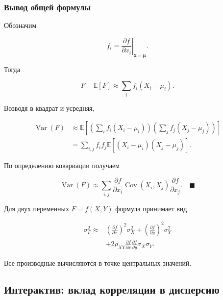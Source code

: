 \documentclass[
  russian,
  12pt,
  a4paper,
  a4paper,
  openany]{scrbook}
\begin{document}
\begin{bookderivation}

\subsubsection{Вывод общей
формулы}\label{ux432ux44bux432ux43eux434-ux43eux431ux449ux435ux439-ux444ux43eux440ux43cux443ux43bux44b}

Обозначим

\[
f_i=\left.\frac{\partial f}{\partial x_i}\right|_{\mathbf x=\boldsymbol\mu}.
\]

Тогда

\[
F-\mathbb E[F]\approx\sum_i f_i(X_i-\mu_i).
\]

Возводя в квадрат и усредняя,

\[
\begin{aligned}
\operatorname{Var}(F)
&\approx
\mathbb E\!\left[
\left(\sum_i f_i(X_i-\mu_i)\right)
\left(\sum_j f_j(X_j-\mu_j)\right)
\right]\\
&=
\sum_{i,j}f_i f_j
\mathbb E[(X_i-\mu_i)(X_j-\mu_j)].
\end{aligned}
\]

По определению ковариации получаем

\[
\boxed{
\operatorname{Var}(F)
\approx
\sum_{i,j}
\frac{\partial f}{\partial x_i}
\operatorname{Cov}(X_i,X_j)
\frac{\partial f}{\partial x_j}.
}
\quad\blacksquare
\]

\end{bookderivation}

Для двух переменных \(F=f(X,Y)\) формула принимает вид

\[
\boxed{
\begin{aligned}
\sigma_F^2\approx{}&
\left(\frac{\partial f}{\partial x}\right)^2\sigma_X^2
+\left(\frac{\partial f}{\partial y}\right)^2\sigma_Y^2\\
&+2\rho_{XY}
\frac{\partial f}{\partial x}
\frac{\partial f}{\partial y}
\sigma_X\sigma_Y.
\end{aligned}
}
\]

Все производные вычисляются в точке центральных значений.

\subsection{Интерактив: вклад корреляции в
дисперсию}\label{ux438ux43dux442ux435ux440ux430ux43aux442ux438ux432-ux432ux43aux43bux430ux434-ux43aux43eux440ux440ux435ux43bux44fux446ux438ux438-ux432-ux434ux438ux441ux43fux435ux440ux441ux438ux44e}
\end{document}
